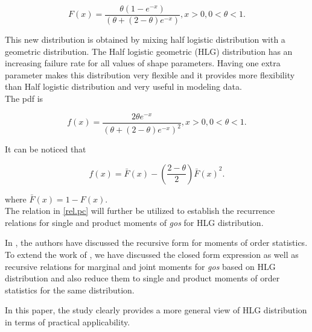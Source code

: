 \documentclass[11pt,a4paper]{article}
\numberwithin{equation}{section}
\begin{document}
	\begin{equation}\label{cdf.hlg}

		F(x)=\dfrac{\theta(1-e^{-x})}{(\theta+(2-\theta)e^{-x})}, x>0,0<\theta<1.

	\end{equation}

	This new distribution is obtained by mixing half logistic distribution with a geometric distribution. The Half logistic geometric (HLG) distribution has an increasing failure rate for all values of shape parameters. Having one extra parameter makes this distribution very flexible and it provides more flexibility than Half logistic distribution and very useful in modeling data.\\

	The pdf is 

	\begin{equation}\label{pdf.hlg}

		f(x)=\dfrac{2\theta e^{-x}}{(\theta+(2-\theta)e^{-x})^2}, x>0,0<\theta<1.

	\end{equation}

	It can be noticed that 

	\begin{equation}\label{rel.pc}

		f(x)=\bar{F}\left(x\right)-\left(\frac{2-\theta}{2}\right){\bar{F}\left(x\right)}^2.

	\end{equation}

	where $\bar{F}\left(x\right)=1-{{F} \left(x\right)}$.\\

	The relation in \eqref{rel.pc} will further be utilized to establish the recurrence relations for single and product moments of \textit{gos} for HLG distribution.

	In \cite{liu2020recurrence}, the authors have discussed the recursive form for moments of order statistics. To extend the work of \cite{liu2020recurrence}, we have discussed the closed form expression as well as recursive relations for marginal and joint moments for  \textit{gos} based on HLG distribution and also reduce them to single and product moments of order statistics for the same distribution.

	 In this paper, the study clearly provides a more general view of HLG distribution in terms of practical applicability. \\
\end{document}
